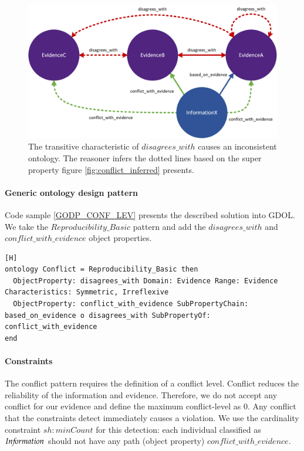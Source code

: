 \begin{figure}[H]
\centering
  \includegraphics[width=13cm]{../../Images/Conflict_Transitive.png}
  \caption{The transitive characteristic of $disagrees\_with$ causes an inconsistent ontology. The reasoner infers the dotted lines based on the super property figure \ref{fig:conflict_inferred} presents.}
  \label{fig:conflict_transitive}
\end{figure}

\paragraph{Generic ontology design pattern}
Code sample \ref{GODP_CONF_LEV} presents the described solution into GDOL. We take the $Reproducibility\_Basic$ pattern and add the $disagrees\_with$ and $conflict\_with\_evidence$ object properties.

\begin{lstlisting}[float,language=GDOL,caption={The GDOL code that extends the reproducibility pattern and results in the conflict pattern. We take the $Reproducibility\_Basic$ pattern and add the $disagrees\_with$ and $conflict\_with\_evidence$ object properties.},label={GODP_CONF_LEV}][H]
ontology Conflict = Reproducibility_Basic then
  ObjectProperty: disagrees_with Domain: Evidence Range: Evidence Characteristics: Symmetric, Irreflexive
  ObjectProperty: conflict_with_evidence SubPropertyChain: based_on_evidence o disagrees_with SubPropertyOf: conflict_with_evidence
end
\end{lstlisting}

\paragraph{Constraints}
The conflict pattern requires the definition of a conflict level. Conflict reduces the reliability of the information and evidence. Therefore, we do not accept any conflict for our evidence and define the maximum conflict-level as $0$. Any conflict that the constraints detect immediately causes a violation. We use the cardinality constraint $sh:minCount$ for this detection: each individual classified as $In{\mkern-2mu f\mkern-3mu}ormation$ should not have any path (object property) $conflict\_with\_evidence$.

